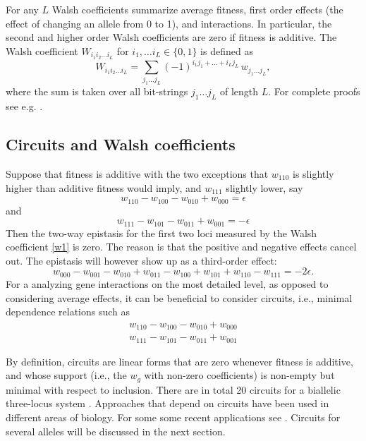 \documentclass[12pt]{amsart}
\theoremstyle{plain}
\theoremstyle{definition}
\begin{document}
For any $L$ Walsh coefficients summarize average fitness, first order effects (the effect of changing an allele from 0 to 1),
and interactions. In particular, the second and higher order Walsh coefficients are zero if fitness is additive.
The Walsh coefficient $W_{i_1 i_2 \dots i_L}$ for $i_1, \dots i_L \in \{ 0,1 \}$  
is defined as 
\[
W_{i_1 i_2 \dots i_L}  =  %
\sum_{j_1 \dots j_L}  (-1)^{ i_1 j_1 + \dots + i_L  j_L} \, w_{j_1 \dots j_L},
\]
where the sum is taken over all bit-strings  $j_1 \dots j_L$ of length $L$.
For complete proofs see e.g. \citet{gp}.






\subsection{Circuits and Walsh coefficients}
Suppose that fitness is additive with the two exceptions
that $w_{110}$ is slightly higher than additive fitness would imply,
and  $w_{111}$ slightly lower, say
\[
w_{110}-w_{100}-w_{010}+w_{000}= \epsilon
\]
and
\[
w_{111}-w_{101}-w_{011}+w_{001}= -\epsilon
\]
Then the two-way epistasis for the first two loci measured by the Walsh coefficient \ref{w1}
is zero. The reason is that  the positive and negative effects cancel out.
The epistasis will however show up as a third-order effect:
\[
w_{000} - w_{001} - w_{010} +w_{011} -w_{100} +w_{101}+ w_{110} -w_{111}=-2 \epsilon .
\]
For a analyzing gene interactions  on the most detailed level, 
as opposed to considering average effects,
it can be beneficial to consider circuits, i.e., minimal dependence
relations such as
\begin{align*}
w_{110}-w_{100}-w_{010}+w_{000}  \\
w_{111}-w_{101}-w_{011}+w_{001}
\end{align*}

By definition, circuits are linear forms that 
are zero whenever fitness is additive,
and whose support
(i.e., the $w_g$ with non-zero coefficients) 
is non-empty but minimal with respect to inclusion.
There are in total 20 circuits for a  biallelic three-locus system \citep{bps}.
Approaches that depend on circuits have been used in 
different areas of biology. For some some recent 
applications see \cite{ejl, cks, by, c1, eble}.
Circuits for several alleles will be discussed in the next section.
\end{document}
